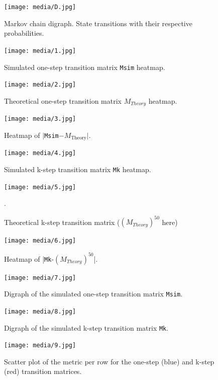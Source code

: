\documentclass[12pt]{article}
\begin{document}
\begin{figure}
    \centering
    \texttt{[image: media/D.jpg]}
    \caption{Markov chain digraph. State transitions with their respective probabilities.}
    \label{fig:myimage}
\end{figure}

\begin{figure}[h!]
    \centering
    \texttt{[image: media/1.jpg]}
    \caption{Simulated one-step transition matrix \texttt{Msim} heatmap.}
    \label{fig:myimage}
\end{figure}
\begin{figure}[h!]
    \centering
    \texttt{[image: media/2.jpg]}
    \caption{Theoretical one-step transition matrix $M_{Theory}$ heatmap.}
    \label{fig:myimage}
\end{figure}
\begin{figure}[h!]
    \centering
    \texttt{[image: media/3.jpg]}
    \caption{Heatmap of \(|\)\texttt{Msim}\(- M_{\text{Theory}}|\).}
    \label{fig:myimage}
\end{figure}
\begin{figure}[h!]
    \centering
    \texttt{[image: media/4.jpg]}
    \caption{Simulated k-step transition matrix \texttt{Mk} heatmap.}
    \label{fig:myimage}
\end{figure}
\begin{figure}[h!]
    \centering
    \texttt{[image: media/5.jpg]}
    \caption{Theoretical k-step transition matrix ($({M_{Theory}})^{50}$ here) }.
    \label{fig:myimage}
\end{figure}
\begin{figure}[h!]
    \centering
    \texttt{[image: media/6.jpg]}
    \caption{Heatmap of |\texttt{Mk}-$({M_{Theory}})^{50}$|.}
    \label{fig:myimage}
\end{figure}
\begin{figure}
    \centering
    \texttt{[image: media/7.jpg]}
    \caption{Digraph of the simulated one-step transition matrix \texttt{Msim}.}
    \label{fig:myimage}
\end{figure}

\begin{figure}
    \centering
    \texttt{[image: media/8.jpg]}
    \caption{Digraph of the simulated k-step transition matrix \texttt{Mk}.}
    \label{fig:myimage}
\end{figure}

\begin{figure}
    \centering
    \texttt{[image: media/9.jpg]}
    \caption{Scatter plot of the metric per row for the one-step (blue) and k-step (red) transition matrices.}
    \label{fig:myimage}
\end{figure}
\end{document}
